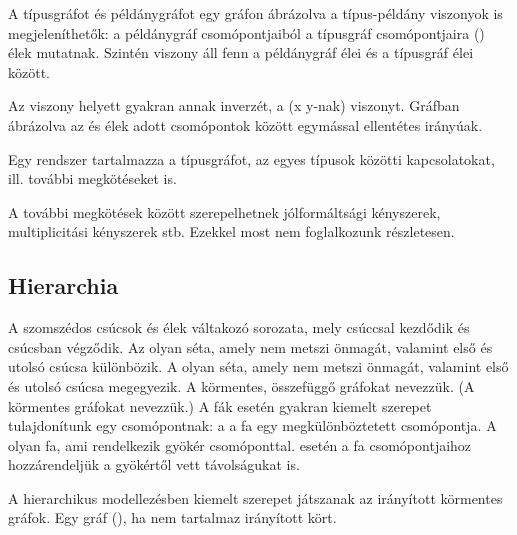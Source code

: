 A típusgráfot és példánygráfot egy gráfon ábrázolva a típus-példány viszonyok is megjeleníthetők: a példánygráf csomópontjaiból a típusgráf csomópontjaira  () élek mutatnak. Szintén  viszony áll fenn a példánygráf élei és a típusgráf élei között.%

\begin{megjegyzes}
	Az  viszony helyett gyakran annak inverzét, a  (x  y-nak) viszonyt. Gráfban ábrázolva az  és  élek adott csomópontok között egymással ellentétes irányúak.
\end{megjegyzes}


\begin{definicio}
	Egy rendszer  tartalmazza a típusgráfot, az egyes típusok közötti kapcsolatokat, ill. további megkötéseket is.

	\begin{megjegyzes}
		A további megkötések között szerepelhetnek jólformáltsági kényszerek, multiplicitási kényszerek stb. Ezekkel most nem foglalkozunk részletesen.
	\end{megjegyzes}
\end{definicio}

\subsection{Hierarchia}

\begin{kisdefiniciok}
	A  szomszédos csúcsok és élek váltakozó sorozata, mely csúccsal kezdődik és csúcsban végződik. %
	Az  olyan séta, amely nem metszi önmagát, valamint első és utolsó csúcsa különbözik. A  olyan séta, amely nem metszi önmagát, valamint első és utolsó csúcsa megegyezik. %
	A körmentes, összefüggő gráfokat  nevezzük. (A körmentes gráfokat  nevezzük.)
	A fák esetén gyakran kiemelt szerepet tulajdonítunk egy csomópontnak: a  a fa egy megkülönböztetett csomópontja. A  olyan fa, ami rendelkezik gyökér csomóponttal.  esetén a fa csomópontjaihoz hozzárendeljük a gyökértől vett távolságukat is.

	A hierarchikus modellezésben kiemelt szerepet játszanak az irányított körmentes gráfok. Egy gráf  (), ha nem tartalmaz irányított kört.
\end{kisdefiniciok}

